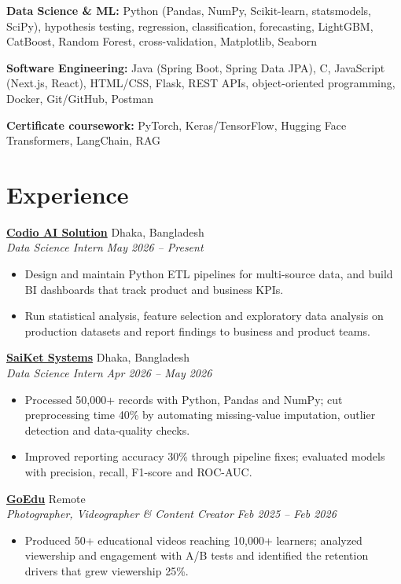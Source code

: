 \documentclass[10pt, letterpaper]{article}
\newcommand{\workentry}[4]{%
    \textbf{#1} \hfill {\small #2}\\[-1pt]%
    \textit{#3} \hfill {\small\textit{#4}}%
}
\begin{document}
\smallskip
\textbf{Data Science \& ML:} Python (Pandas, NumPy, Scikit-learn, statsmodels, SciPy), hypothesis testing,
regression, classification, forecasting, LightGBM, CatBoost, Random Forest, cross-validation, Matplotlib, Seaborn

\smallskip
\textbf{Software Engineering:} Java (Spring Boot, Spring Data JPA), C, JavaScript (Next.js, React), HTML/CSS,
Flask, REST APIs, object-oriented programming, Docker, Git/GitHub, Postman

\smallskip
\textbf{Certificate coursework:} PyTorch, Keras/TensorFlow, Hugging Face Transformers, LangChain, RAG

\section{Experience}

\workentry{\href{https://codioaisolution.com/}{Codio AI Solution}}{Dhaka, Bangladesh}%
{Data Science Intern}{May 2026 -- Present}
\begin{itemize}
    \item Design and maintain Python ETL pipelines for multi-source data, and build BI dashboards that track
          product and business KPIs.
    \item Run statistical analysis, feature selection and exploratory data analysis on production datasets
          and report findings to business and product teams.
\end{itemize}

\vspace{3pt}
\workentry{\href{https://saiketsystems.in}{SaiKet Systems}}{Dhaka, Bangladesh}%
{Data Science Intern}{Apr 2026 -- May 2026}
\begin{itemize}
    \item Processed 50,000+ records with Python, Pandas and NumPy; cut preprocessing time 40\% by automating
          missing-value imputation, outlier detection and data-quality checks.
    \item Improved reporting accuracy 30\% through pipeline fixes; evaluated models with precision, recall,
          F1-score and ROC-AUC.
\end{itemize}

\vspace{3pt}
\workentry{\href{https://goedu.ac}{GoEdu}}{Remote}%
{Photographer, Videographer \& Content Creator}{Feb 2025 -- Feb 2026}
\begin{itemize}
    \item Produced 50+ educational videos reaching 10,000+ learners; analyzed viewership and engagement with
          A/B tests and identified the retention drivers that grew viewership 25\%.
\end{itemize}
\end{document}
